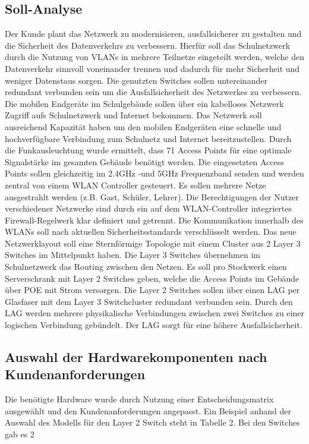 \subsection{Soll-Analyse}
\label{sec:Soll-Analyse}
Der Kunde plant das Netzwerk zu modernisieren, ausfallsicherer zu gestalten und die Sicherheit des Datenverkehrs zu verbessern. Hierfür soll das Schulnetzwerk durch die Nutzung von \acs{VLAN}s in mehrere Teilnetze eingeteilt werden, welche den Datenverkehr sinnvoll voneinander trennen und dadurch für mehr Sicherheit und weniger Datenstaus sorgen. Die genutzten Switches sollen untereinander redundant verbunden sein um die Ausfallsicherheit des Netzwerkes zu verbessern. Die mobilen Endgeräte im Schulgebäude sollen über ein kabelloses Netzwerk Zugriff aufs Schulnetzwerk und Internet bekommen. Das Netzwerk soll ausreichend Kapazität haben um den mobilen Endgeräten eine schnelle und hochverfügbare Verbindung zum Schulnetz und Internet bereitzustellen. Durch die Funkausleuchtung wurde ermittelt, dass 71 Access Points für eine optimale Signalstärke im gesamten Gebäude benötigt werden.
Die eingesetzten Access Points sollen gleichzeitig im 2.4GHz -und 5GHz Frequenzband senden und werden zentral von einem WLAN Controller gesteuert.
Es sollen mehrere Netze ausgestrahlt werden (z.B. Gast, Schüler, Lehrer). 
Die Berechtigungen der Nutzer verschiedener Netzwerke sind durch ein auf dem WLAN-Controller integriertes Firewall-Regelwerk klar definiert und getrennt. 
Die Kommunikation innerhalb des WLANs soll nach aktuellen Sicherheitsstandards verschlüsselt werden. Das neue Netzwerklayout soll eine Sternförmige Topologie mit einem Cluster aus 2 Layer 3 Switches im Mittelpunkt haben. Die Layer 3 Switches übernehmen im Schulnetzwerk das Routing zwischen den Netzen. Es soll pro Stockwerk einen Serverschrank mit Layer 2 Switches geben, welche die Access Points im Gebäude über \ac{POE} mit Strom versorgen. Die Layer 2 Switches sollen über einen \ac{LAG} per Glasfaser mit dem Layer 3 Switchcluster redundant verbunden sein. Durch den LAG werden mehrere physikalische Verbindungen zwischen zwei Switches zu einer logischen Verbindung gebündelt. Der LAG sorgt für eine höhere Ausfallsicherheit. 

\begin{comment}
	\item Wie ist die bisherige Situation (\zB bestehende Programme, Wünsche der Mitarbeiter)?
	\item Was gilt es zu erstellen/verbessern?
\end{comment}
\subsection{Auswahl der Hardwarekomponenten nach Kundenanforderungen}
\label{app:Auswahl der Hardwarekomponenten nach Kundenanforderungen}
Die benötigte Hardware wurde durch Nutzung einer Entscheidungsmatrix ausgewählt und den Kundenanforderungen angepasst. Ein Beispiel anhand der Auswahl des Modells für den Layer 2 Switch steht in Tabelle 2. Bei den Switches gab es 2 

